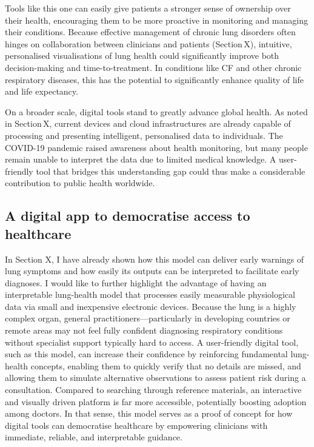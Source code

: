 Tools like this one can easily give patients a stronger sense of ownership over their health, encouraging them to be more proactive in monitoring and managing their conditions. Because effective management of chronic lung disorders often hinges on collaboration between clinicians and patients (Section X), intuitive, personalised visualisations of lung health could significantly improve both decision-making and time-to-treatment. In conditions like CF and other chronic respiratory diseases, this has the potential to significantly enhance quality of life and life expectancy.

On a broader scale, digital tools stand to greatly advance global health. As noted in Section X, current devices and cloud infrastructures are already capable of processing and presenting intelligent, personalised data to individuals. The COVID-19 pandemic raised awareness about health monitoring, but many people remain unable to interpret the data due to limited medical knowledge. A user-friendly tool that bridges this understanding gap could thus make a considerable contribution to public health worldwide.

\subsection{A digital app to democratise access to healthcare}
In Section X, I have already shown how this model can deliver early warnings of lung symptoms and how easily its outputs can be interpreted to facilitate early diagnoses. I would like to further highlight the advantage of having an interpretable lung-health model that processes easily measurable physiological data via small and inexpensive electronic devices. Because the lung is a highly complex organ, general practitioners—particularly in developing countries or remote areas may not feel fully confident diagnosing respiratory conditions without specialist support typically hard to access. A user-friendly digital tool, such as this model, can increase their confidence by reinforcing fundamental lung-health concepts, enabling them to quickly verify that no details are missed, and allowing them to simulate alternative observations to assess patient risk during a consultation. Compared to searching through reference materials, an interactive and visually driven platform is far more accessible, potentially boosting adoption among doctors. In that sense, this model serves as a proof of concept for how digital tools can democratise healthcare by empowering clinicians with immediate, reliable, and interpretable guidance.

